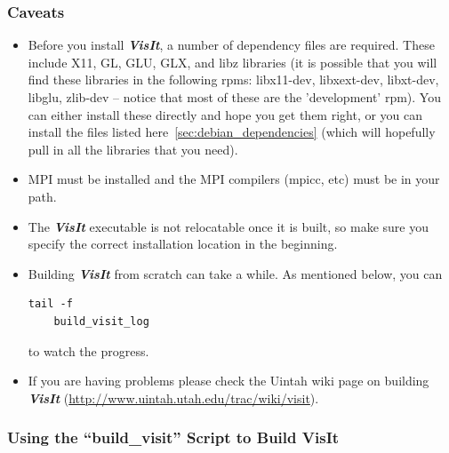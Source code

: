 \documentclass[12pt]{article}
\begin{document}
\subsubsection{Caveats}
\label{subsec:VisIt_Caveats}
\begin{itemize}
\item Before you install \textbf{\emph{VisIt}}, a number of dependency
  files are required.  These include X11, GL, GLU, GLX, and libz
  libraries (it is possible that you will find these libraries in the
  following rpms: libx11-dev, libxext-dev, libxt-dev, libglu, zlib-dev
  -- notice that most of these are the 'development' rpm).  You can
  either install these directly and hope you get them right, or you
  can install the files listed here~\ref{sec:debian_dependencies}
  (which will hopefully pull in all the libraries that you need).
\item MPI must be installed and the MPI compilers (mpicc, etc) must be
  in your path.
\item The \textbf{\emph{VisIt}} executable is not relocatable once it
  is built, so make sure you specify the correct installation location
  in the beginning.
\item Building \textbf{\emph{VisIt}} from scratch can take a while.
  As mentioned below, you can \begin{verbatim}tail -f
    build_visit_log\end{verbatim} to watch the progress.
\item If you are having problems please check the Uintah wiki page on
  building \textbf{\emph{VisIt}}
  (\url{http://www.uintah.utah.edu/trac/wiki/visit}).

\end{itemize}



\subsubsection{Using the ``build\_visit'' Script to Build VisIt}
\label{subsec:VisItVersion2_tarball}
\end{document}
